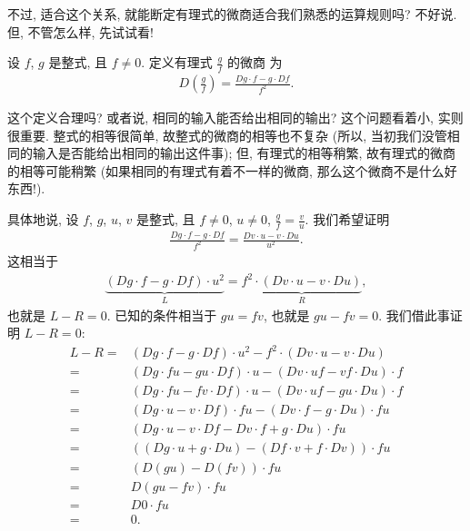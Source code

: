 不过, 适合这个关系, 就能断定有理式的微商适合我们熟悉的运算规则吗? 不好说. 但, 不管怎么样, 先试试看!

\begin{definition}
    设 $f$, $g$ 是整式, 且 $f \neq 0$. 定义有理式 $\frac{g}{f}$ 的微商  为
    \begin{align*}
        D \left( \frac{g}{f} \right) = \frac{Dg \cdot f - g \cdot Df}{f^2}.
    \end{align*}
\end{definition}

这个定义合理吗? 或者说, 相同的输入能否给出相同的输出? 这个问题看着小, 实则很重要. 整式的相等很简单, 故整式的微商的相等也不复杂 (所以, 当初我们没管相同的输入是否能给出相同的输出这件事); 但, 有理式的相等稍繁, 故有理式的微商的相等可能稍繁 (如果相同的有理式有着不一样的微商, 那么这个微商不是什么好东西!).

具体地说, 设 $f$, $g$, $u$, $v$ 是整式, 且 $f \neq 0$, $u \neq 0$, $\frac{g}{f} = \frac{v}{u}$. 我们希望证明
\begin{align*}
    \frac{Dg \cdot f - g \cdot Df}{f^2} = \frac{Dv \cdot u - v \cdot Du}{u^2}.
\end{align*}
这相当于
\begin{align*}
    \underbrace{(Dg \cdot f - g \cdot Df) \cdot u^2}_{L} = \underbrace{f^2 \cdot (Dv \cdot u - v \cdot Du)}_{R},
\end{align*}
也就是 $L - R = 0$. 已知的条件相当于 $gu = fv$, 也就是 $gu - fv = 0$. 我们借此事证明 $L - R = 0$:
\begin{align*}
    L - R
    = {} & (Dg \cdot f - g \cdot Df) \cdot u^2 - f^2 \cdot (Dv \cdot u - v \cdot Du) \\
    = {} & (Dg \cdot fu - gu \cdot Df) \cdot u - (Dv \cdot uf - vf \cdot Du) \cdot f \\
    = {} & (Dg \cdot fu - fv \cdot Df) \cdot u - (Dv \cdot uf - gu \cdot Du) \cdot f \\
    = {} & (Dg \cdot u - v \cdot Df) \cdot fu - (Dv \cdot f - g \cdot Du) \cdot fu   \\
    = {} & (Dg \cdot u - v \cdot Df - Dv \cdot f + g \cdot Du) \cdot fu              \\
    = {} & ((Dg \cdot u + g \cdot Du) - (Df \cdot v + f \cdot Dv)) \cdot fu          \\
    = {} & (D(gu) - D(fv)) \cdot fu                                                  \\
    = {} & D(gu - fv) \cdot fu                                                       \\
    = {} & D0 \cdot fu                                                               \\
    = {} & 0.
\end{align*}

